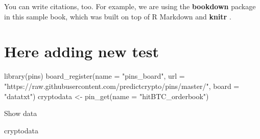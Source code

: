 \documentclass[
]{book}
\newenvironment{Shaded}{\begin{snugshade}}{\end{snugshade}}
\newcommand{\AttributeTok}[1]{\textcolor[rgb]{0.77,0.63,0.00}{#1}}
\newcommand{\FunctionTok}[1]{\textcolor[rgb]{0.00,0.00,0.00}{#1}}
\newcommand{\NormalTok}[1]{#1}
\newcommand{\OtherTok}[1]{\textcolor[rgb]{0.56,0.35,0.01}{#1}}
\newcommand{\StringTok}[1]{\textcolor[rgb]{0.31,0.60,0.02}{#1}}
\begin{document}
You can write citations, too. For example, we are using the \textbf{bookdown} package \citep{R-bookdown} in this sample book, which was built on top of R Markdown and \textbf{knitr} \citep{xie2015}.

\hypertarget{here-adding-new-test}{%
\section{Here adding new test}\label{here-adding-new-test}}

\begin{Shaded}
\begin{Highlighting}[]
\FunctionTok{library}\NormalTok{(pins)}
\FunctionTok{board\_register}\NormalTok{(}\AttributeTok{name =} \StringTok{"pins\_board"}\NormalTok{, }\AttributeTok{url =} \StringTok{"https://raw.githubusercontent.com/predictcrypto/pins/master/"}\NormalTok{, }\AttributeTok{board =} \StringTok{"datatxt"}\NormalTok{)}
\NormalTok{cryptodata }\OtherTok{\textless{}{-}} \FunctionTok{pin\_get}\NormalTok{(}\AttributeTok{name =} \StringTok{"hitBTC\_orderbook"}\NormalTok{)}
\end{Highlighting}
\end{Shaded}

Show data

\begin{Shaded}
\begin{Highlighting}[]
\NormalTok{cryptodata}
\end{Highlighting}
\end{Shaded}
\end{document}
